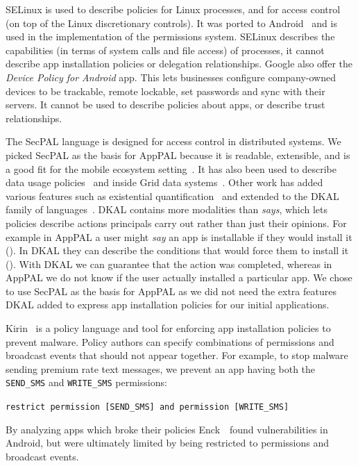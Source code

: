 \documentclass[]{llncs}
\newcommand{\citep}[1]{\cite{#1}}
\begin{document}
SELinux is used to describe policies for Linux processes, and for access control (on top of the Linux discretionary controls).
It was ported to Android~\cite{Smalley:2013vl} and is used in the implementation of the permissions system.
SELinux describes the capabilities (in terms of system calls and file access) of processes, it cannot describe app installation policies or delegation relationships.
Google also offer the \emph{Device Policy for Android} app.
This lets businesses configure company-owned devices to be trackable, remote lockable, set passwords and sync with their servers.
It cannot be used to describe policies about apps, or describe trust relationships.

The SecPAL language is designed for access control in distributed systems.
We picked SecPAL as the basis for AppPAL because it is readable, extensible, and is a good fit for the mobile ecosystem setting~\citep{Hallett:2014un}.
It has also been used to describe data usage policies~\cite{Aziz:2011vt} and inside Grid data systems~\cite{Humphrey:2007wc}.
Other work has added various features such as existential
quantification~\cite{Becker:2009vt} and extended to the DKAL family of languages~\cite{Gurevich:2008fz,Gurevich:Qo5E3M3}.
DKAL contains more modalities than \emph{says}, which lets policies describe actions principals carry out rather than just their opinions.
For example in AppPAL a user might \emph{say} an app is installable if they would install it ().
In DKAL they can describe the conditions that would force them to install it ().
With DKAL we can guarantee that the action was completed, whereas in AppPAL we do not know if the user actually installed a particular app.
We chose to use SecPAL as the basis for AppPAL as we did not need the extra features DKAL added to express app installation policies for our initial applications.

Kirin~\cite{Enck:2009ko} is a policy language and tool for enforcing app installation policies to prevent malware.
Policy authors can specify combinations of permissions and broadcast events that should not appear together.
For example, to stop malware sending premium rate text messages, we prevent an app having both the \texttt{SEND\_SMS} and \texttt{WRITE\_SMS} permissions:

\lstinline!restrict permission [SEND_SMS] and permission [WRITE_SMS]!

By analyzing apps which broke their policies Enck~\etal~found vulnerabilities in Android, but were ultimately limited by being restricted to permissions and broadcast events.
\end{document}

